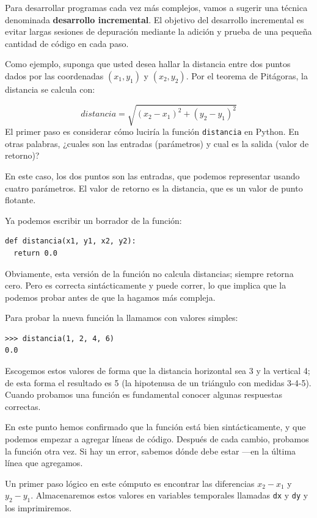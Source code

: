 Para desarrollar programas cada vez más complejos, vamos a sugerir
una técnica denominada \textbf{desarrollo incremental}. El objetivo
del desarrollo incremental es evitar largas sesiones de depuración
mediante la adición y prueba de una pequeña cantidad de código en
cada paso.

 

Como ejemplo, suponga que usted desea hallar la distancia entre dos
puntos dados por las coordenadas $(x_{1},y_{1})$ y $(x_{2},y_{2})$.
Por el teorema de Pitágoras, la distancia se calcula con:

\begin{equation}
distancia=\sqrt{(x_{2}-x_{1})^{2}+(y_{2}-y_{1})^{2}}
\end{equation}
El primer paso es considerar cómo luciría la función \texttt{distancia}
en Python. En otras palabras, ¿cuales son las entradas (parámetros)
y cual es la salida (valor de retorno)?

En este caso, los dos puntos son las entradas, que podemos representar
usando cuatro parámetros. El valor de retorno es la distancia, que
es un valor de punto flotante.

Ya podemos escribir un borrador de la función:

\begin{verbatim}
def distancia(x1, y1, x2, y2):
  return 0.0
\end{verbatim}
 Obviamente, esta versión de la función no calcula distancias; siempre
retorna cero. Pero es correcta sintácticamente y puede correr, lo
que implica que la podemos probar antes de que la hagamos más compleja.

Para probar la nueva función la llamamos con valores simples:

\begin{verbatim}
>>> distancia(1, 2, 4, 6)
0.0
\end{verbatim}
 Escogemos estos valores de forma que la distancia horizontal sea
3 y la vertical 4; de esta forma el resultado es 5 (la hipotenusa
de un triángulo con medidas 3-4-5). Cuando probamos una función es
fundamental conocer algunas respuestas correctas.

En este punto hemos confirmado que la función está bien sintácticamente,
y que podemos empezar a agregar líneas de código. Después de cada
cambio, probamos la función otra vez. Si hay un error, sabemos dónde
debe estar —en la última línea que agregamos.

Un primer paso lógico en este cómputo es encontrar las diferencias
$x_{2}-x_{1}$ y $y_{2}-y_{1}$. Almacenaremos estos valores en variables
temporales llamadas \texttt{dx} y \texttt{dy} y los imprimiremos.

